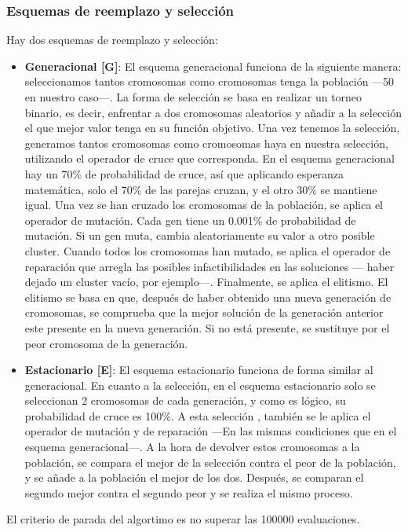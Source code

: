 \subsubsection{Esquemas de reemplazo y selección}
Hay dos esquemas de reemplazo y selección:
\begin{itemize}
   \item \textbf{Generacional [G]}: El esquema generacional funciona de la siguiente manera: seleccionamos tantos cromosomas como cromosomas tenga la población ---50 en nuestro caso---. La forma de selección se basa en realizar un torneo binario, es decir, enfrentar a dos cromosomas aleatorios y añadir a la selección el que mejor valor tenga en su función objetivo. Una vez tenemos la selección, generamos tantos cromosomas como cromosomas haya en nuestra selección, utilizando el operador de cruce que corresponda. En el esquema generacional hay un 70\% de probabilidad de cruce, así que aplicando esperanza matemática, solo el 70\% de las parejas cruzan, y el otro 30\% se mantiene igual. Una vez se han cruzado los cromosomas de la población, se aplica el operador de mutación. Cada gen tiene un 0.001\% de probabilidad de mutación. Si un gen muta, cambia aleatoriamente su valor a otro posible cluster. Cuando todos los cromosomas han mutado, se aplica el operador de reparación que arregla las posibles infactibilidades en las soluciones --- haber dejado un cluster vacío, por ejemplo---. Finalmente, se aplica el elitismo. El elitismo se basa en que, después de haber obtenido una nueva generación de cromosomas, se comprueba que la mejor solución de la generación anterior este presente en la nueva generación. Si no está presente, se sustituye por el peor cromosoma de la generación.
   \item \textbf{Estacionario [E]}: El esquema estacionario funciona de forma similar al generacional. En cuanto a la selección, en el esquema estacionario solo se seleccionan 2 cromosomas de cada generación, y como es lógico, su probabilidad de cruce es 100\%. A esta selección , también se le aplica el operador de mutación y de reparación ---En las mismas condiciones que en el esquema generacional---. A la hora de devolver estos cromosomas a la población, se compara el mejor de la selección contra el peor de la población, y se añade a la población el mejor de los dos. Después, se comparan el segundo mejor contra el segundo peor y se realiza el mismo proceso.
\end{itemize}
El criterio de parada del algortimo es no superar las 100000 evaluaciones.

